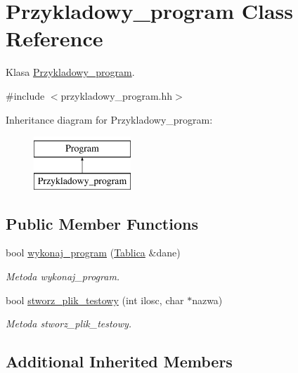 \hypertarget{class_przykladowy__program}{\section{Przykladowy\+\_\+program Class Reference}
\label{class_przykladowy__program}
}


Klasa \hyperlink{class_przykladowy__program}{Przykladowy\+\_\+program}.  




{\ttfamily \#include $<$przykladowy\+\_\+program.\+hh$>$}

Inheritance diagram for Przykladowy\+\_\+program\+:\begin{figure}[H]
\begin{center}
\leavevmode
\includegraphics[height=2.000000cm]{class_przykladowy__program}
\end{center}
\end{figure}
\subsection*{Public Member Functions}
\begin{DoxyCompactItemize}
\item 
bool \hyperlink{class_przykladowy__program_a4215d5b5562be2a26f601dec4d4f6501}{wykonaj\+\_\+program} (\hyperlink{class_tablica}{Tablica} \&dane)
\begin{DoxyCompactList}\small\item\em Metoda wykonaj\+\_\+program. \end{DoxyCompactList}\item 
bool \hyperlink{class_przykladowy__program_a01cb33d6717d2dfd159f4607b7c8269f}{stworz\+\_\+plik\+\_\+testowy} (int ilosc, char $\ast$nazwa)
\begin{DoxyCompactList}\small\item\em Metoda stworz\+\_\+plik\+\_\+testowy. \end{DoxyCompactList}\end{DoxyCompactItemize}
\subsection*{Additional Inherited Members}


